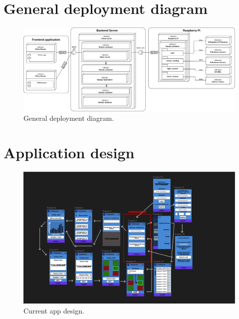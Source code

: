 \begin{appendices}
\makeatletter
{}
\makeatother


\section{General deployment diagram}\label{app:deployment-diagram}
\begin{landscape}
   \begin{figure}
    \centering
    \includegraphics[width=25cm]{images/deployment_diagram.drawio.png}
    \caption{General deployment diagram.}
    \label{fig:general-deployment-diagram}
\end{figure}
\end{landscape}

\clearpage


\section{Application design}\label{app:app-design}
\begin{figure}[htp]
    \centering
    \includegraphics[width=16cm]{images/AppDesign.png}
    \caption{Current app design.}
    \label{fig:AppDesign}
\end{figure}


\end{appendices}
